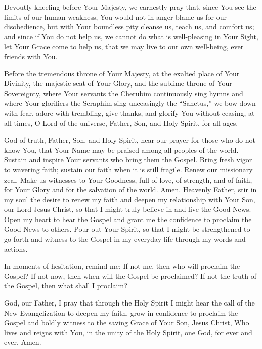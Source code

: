 Devoutly kneeling before Your Majesty,
we earnestly pray that, since You see the limits of our human weakness, You would not in anger blame us for our disobedience, but with Your boundless pity cleanse us, teach us, and comfort us;
and since if You do not help us, we cannot do what is well-pleasing in Your Sight, let Your Grace come to help us, that we may live to our own well-being, ever friends with You.

Before the tremendous throne of Your Majesty, at the exalted place of Your Divinity, the majestic seat of Your Glory, and the sublime throne of Your Sovereignty, where Your servants the Cherubim continuously sing hymns and where Your glorifiers the Seraphim sing unceasingly the ``Sanctus,'' we bow down with fear, adore with trembling, give thanks, and glorify You without ceasing, at all times, O Lord of the universe, Father, Son, and Holy Spirit, for all ages.

God of truth, Father, Son, and Holy Spirit, hear our prayer for those who do not know You, that Your Name may be praised among all peoples of the world.
Sustain and inspire Your servants who bring them the Gospel.
Bring fresh vigor to wavering faith; sustain our faith when it is still fragile.
Renew our missionary zeal.
Make us witnesses to Your Goodness, full of love, of strength, and of faith, for Your Glory and for the salvation of the world.
Amen.
\newpage
{}
\label{prayer:new_evangelization}
Heavenly Father, stir in my soul the desire to renew my faith and deepen my relationship with Your Son, our Lord Jesus Christ, so that I might truly believe in and live the Good News.   
Open my heart to hear the Gospel and grant me the confidence to proclaim the Good News to others.
Pour out Your Spirit, so that I might be strengthened to go forth and witness to the Gospel in my everyday life through my words and actions.  

In moments of hesitation, remind me:
If not me, then who will proclaim the Gospel?
If not now, then when will the Gospel be proclaimed?
If not the truth of the Gospel, then what shall I proclaim?

God, our Father, I pray that through the Holy Spirit I might hear the call of the New Evangelization to deepen my faith, grow in confidence to proclaim the Gospel and boldly witness to the saving Grace of Your Son, Jesus Christ, Who lives and reigns with You, in the unity of the Holy Spirit, one God, for ever and ever.
Amen.

